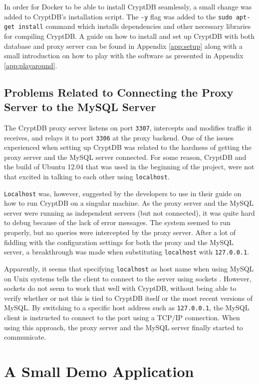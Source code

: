 In order for Docker to be able to install CryptDB seamlessly, a small change was added to CryptDB's installation script. The \texttt{-y} flag was added to the \texttt{sudo apt-get install} command which installs dependencies and other necessary libraries for compiling CryptDB. A guide on how to install and set up CryptDB with both database and proxy server can be found in Appendix \ref{app:setup} along with a small introduction on how to play with the software as presented in Appendix \ref{app:playaround}.


\subsection{Problems Related to Connecting the Proxy Server to the MySQL Server}

The CryptDB proxy server listens on port \verb!3307!, intercepts and modifies traffic it receives, and relays it to port \verb!3306! at the proxy backend. One of the issues experienced when setting up CryptDB was related to the hardness of getting the proxy server and the MySQL server connected. For some reason, CryptDB and the build of Ubuntu 12.04 that was used in the beginning of the project, were not that excited in talking to each other using \verb!localhost!.

\texttt{Localhost} was, however, suggested by the developers to use in their guide on how to run CryptDB on a singular machine. As the proxy server and the MySQL server were running as independent servers (but not connected), it was quite hard to debug because of the lack of error messages. The system seemed to run properly, but no queries were intercepted by the proxy server. After a lot of fiddling with the configuration settings for both the proxy and the MySQL server, a breakthrough was made when substituting \texttt{localhost} with \texttt{127.0.0.1}.

Apparently, it seems that specifying \texttt{localhost} as host name when using MySQL on Unix systems tells the client to connect to the server using sockets \cite{mysql_doc}. However, sockets do not seem to work that well with CryptDB, without being able to verify whether or not this is tied to CryptDB itself or the most recent versions of MySQL. By switching to a specific host address such as \verb!127.0.0.1!, the MySQL client is instructed to connect to the port using a TCP/IP connection. When using this approach, the proxy server and the MySQL server finally started to communicate.


\section{A Small Demo Application}

